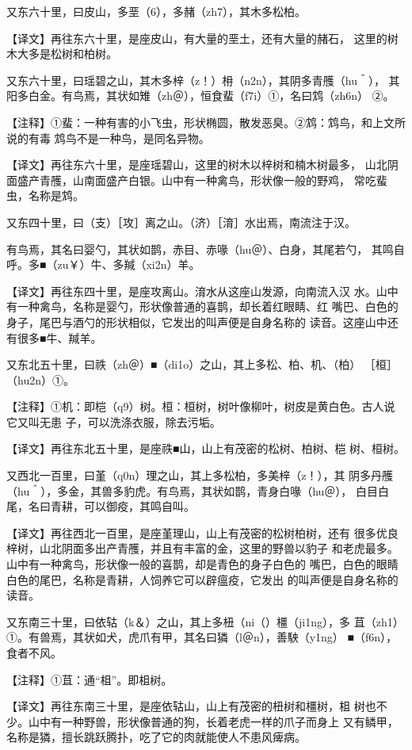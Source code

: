 \documentclass[a4paper,12pt,UTF8,twoside]{ctexbook}
\begin{document}
又东六十里，曰皮山，多垩（6），多赭（zh7），其木多松柏。

【译文】再往东六十里，是座皮山，有大量的垩土，还有大量的赭石， 这里的树木大多是松树和柏树。

又东六十里，曰瑶碧之山，其木多梓（z！）枏（n2n），其阴多青雘（hu＾）， 其阳多白金。有鸟焉，其状如雉（zh＠），恒食蜚（f7i）①，名曰鸩（zh6n） ②。

【注释】①蜚：一种有害的小飞虫，形状椭圆，散发恶臭。②鸩：鸩鸟，和上文所说的有毒 鸩鸟不是一种鸟，是同名异物。

【译文】再往东六十里，是座瑶碧山，这里的树木以梓树和楠木树最多， 山北阴面盛产青雘，山南面盛产白银。山中有一种禽鸟，形状像一般的野鸡， 常吃蜚虫，名称是鸩。

又东四十里，曰（支）［攻］离之山。（济）［淯］水出焉，南流注于汉。

有鸟焉，其名曰婴勺，其状如鹊，赤目、赤喙（hu＠）、白身，其尾若勺， 其鸣自呼。多■（zu￥）牛、多羬（xi2n）羊。

【译文】再往东四十里，是座攻离山。淯水从这座山发源，向南流入汉 水。山中有一种禽鸟，名称是婴勺，形状像普通的喜鹊，却长着红眼睛、红 嘴巴、白色的身子，尾巴与酒勺的形状相似，它发出的叫声便是自身名称的 读音。这座山中还有很多■牛、羬羊。

又东北五十里，曰祑（zh＠）■（di1o）之山，其上多松、柏、机、（柏） ［桓］（hu2n）①。

【注释】①机：即桤（q9）树。桓：桓树，树叶像柳叶，树皮是黄白色。古人说它又叫无患 子，可以洗涤衣服，除去污垢。

【译文】再往东北五十里，是座祑■山，山上有茂密的松树、柏树、桤 树、桓树。

又西北一百里，曰堇（q0n）理之山，其上多松柏，多美梓（z！），其 阴多丹雘（hu＾），多金，其兽多豹虎。有鸟焉，其状如鹊，青身白喙（hu＠）， 白目白尾，名曰青耕，可以御疫，其鸣自叫。

【译文】再往西北一百里，是座堇理山，山上有茂密的松树柏树，还有 很多优良梓树，山北阴面多出产青雘，并且有丰富的金，这里的野兽以豹子 和老虎最多。山中有一种禽鸟，形状像一般的喜鹊，却是青色的身子白色的 嘴巴，白色的眼睛白色的尾巴，名称是青耕，人饲养它可以辟瘟疫，它发出 的叫声便是自身名称的读音。

又东南三十里，曰依轱（k＆）之山，其上多杻（ni（）橿（ji1ng），多 苴（zh1）①。有兽焉，其状如犬，虎爪有甲，其名曰獜（l＠n），善駚（y1ng） ■（f6n），食者不风。

【注释】①苴：通“柤”。即柤树。

【译文】再往东南三十里，是座依轱山，山上有茂密的杻树和橿树，柤 树也不少。山中有一种野兽，形状像普通的狗，长着老虎一样的爪子而身上 又有鳞甲，名称是獜，擅长跳跃腾扑，吃了它的肉就能使人不患风痺病。
\end{document}
